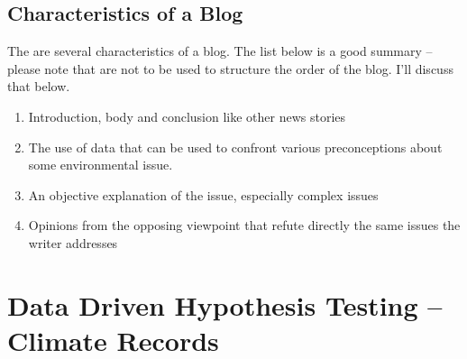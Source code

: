 \documentclass{tufte-handout}\usepackage[]{graphicx}\usepackage[]{color}
\begin{document}
\subsection{Characteristics of a Blog}

The are several characteristics of a blog. The list below is a good summary -- please note that are not to be used to structure the order of the blog. I'll discuss that below. 

\begin{enumerate}
	\item Introduction, body and conclusion like other news stories
	\item The use of data that can be used to confront various preconceptions about some environmental issue.
	\item An objective explanation of the issue, especially complex issues
	\item Opinions from the opposing viewpoint that refute directly the same issues the writer addresses
\end{enumerate}




\section{Data Driven Hypothesis Testing -- Climate Records}
\end{document}
